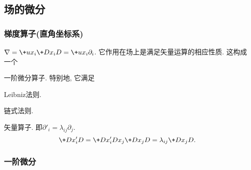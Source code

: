 \documentclass[hidelinks]{ctexart}
\begin{document}


\subsection{场的微分} %
\label{sub:场的微分}

\subsubsection{梯度算子(直角坐标系)} %
\label{ssub:梯度算子}

$\nabla = \displaystyle \+ux_i \+D{x_i}D{} = \+ux_i\partial_i$. 它作用在场上是满足矢量运算的相应性质. 这构成一个
\begin{cenum}
    \item 一阶微分算子. 特别地, 它满足
    \begin{cenum}
        \item Leibniz法则.
        \item 链式法则.
    \end{cenum}
    \item 矢量算子. 即$\partial'_i = \lambda_{ij}\partial_j$.
    \[ \+D{x'_i}D{} = \+D{x'_i}D{x_j}\+D{x_j}D{} = \lambda_{ij}\+D{x_j}D{}. \]
\end{cenum}


\subsubsection{一阶微分} %
\label{ssub:一阶微分}
\end{document}
